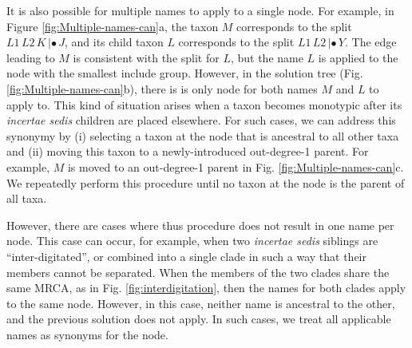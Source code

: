 \documentclass[english]{article}
\begin{document}
It is also possible for multiple names to apply to a single node. For example,
in Figure \ref{fig:Multiple-names-can}a, the taxon $M$ corresponds to the split
$L1\,L2\,K\,|\bullet\,J$, and its child taxon $L$ corresponds to the split $L1\,L2\,|\bullet\,Y$.
The edge leading to $M$ is consistent with the split for $L$, but the name $L$ is
applied to the node with the smallest include group.
However, in the
solution tree (Fig. \ref{fig:Multiple-names-can}b), there is is only node for
both names $M$ and $L$ to apply to.
This kind of situation arises when a taxon
becomes monotypic after its \emph{incertae sedis} children are placed elsewhere.
For such cases, we can address this synonymy by (i) selecting a taxon at the
node that is ancestral to all other taxa and (ii) moving this taxon to a
newly-introduced out-degree-1 parent.  For example, $M$ is moved to an
out-degree-1 parent in Fig. \ref{fig:Multiple-names-can}c.
We repeatedly perform
this procedure until no taxon at the node is the parent of all taxa.


However, there are cases where thus procedure does not result in one name per
node.  This case can occur, for example, when two \emph{incertae sedis} siblings are 
``inter-digitated'', or  combined into a single clade in such a way that their
members cannot be separated.  When the members of the two clades share the same
MRCA, as in Fig. \ref{fig:interdigitation}, then the names for both clades
apply to the same node.  However, in this case, neither name is ancestral to
the other, and the previous solution does not apply.
In such cases, we treat all applicable names as synonyms for the node.
\end{document}
